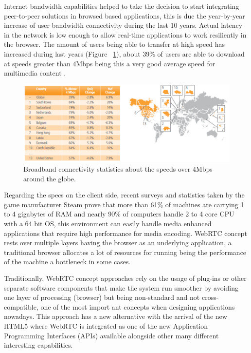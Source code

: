 Internet bandwidth capabilities helped to take the decision to start integrating peer-to-peer solutions in browsed based applications, this is due the year-by-year increase of user bandwidth connectivity during the last 10 years. Actual latency in the network is low enough to allow real-time applications to work resiliently in the browser. The amount of users being able to transfer at high speed has increased during last years (Figure ~\ref{fig:bwWorldAvg}), about 39\% of users are able to download at speeds greater than 4Mbps being this a very good average speed for multimedia content \cite{akamaiq2}.

\begin{figure}[h]
  \centering
    \includegraphics[width=1\textwidth]{./figures/internetstats.pdf}
      \caption[Broadband over 4Mbps connectivity statistics]{Broadband connectivity statistics about the speeds over 4Mbps around the globe.}
	\label{fig:bwWorldAvg}
\end{figure}

Regarding the specs on the client side, recent surveys and statistics taken by the game manufacturer Steam  \cite{steamStats} prove that more than  61\% of machines are carrying 1 to 4 gigabytes of RAM and nearly 90\% of computers handle 2 to 4 core CPU with a 64 bit OS, this environment can easily handle media enhanced applications that require high performance for media encoding. WebRTC concept rests over multiple layers having the browser as an underlying application, a traditional browser allocates a lot of resources for running being the performance of the machine a bottleneck in some cases.

Traditionally, WebRTC concept approaches rely on the usage of plug-ins or other separate software components that make the system run smoother by avoiding one layer of processing (browser) but being non-standard and not cross-compatible, one of the most import ant concepts when designing applications nowadays. This approach has a new alternative with the arrival of the new HTML5 where WebRTC is integrated as one of the new Application Programming Interfaces (APIs) available alongside other many different interesting capabilities.

